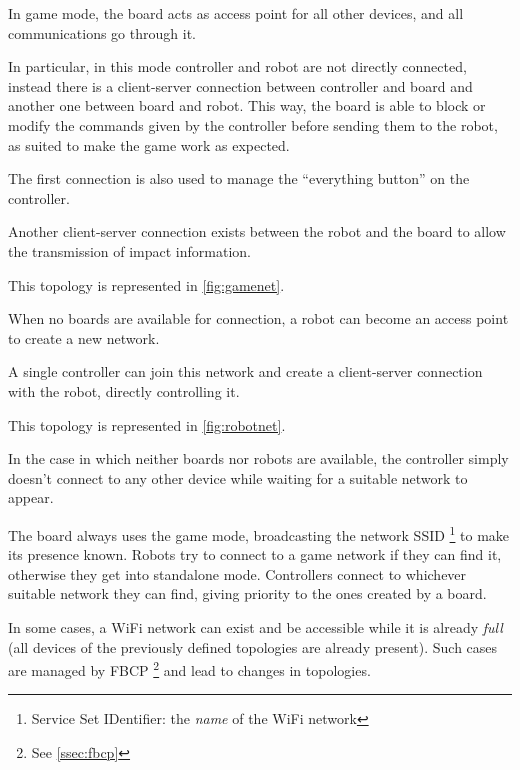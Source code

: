 \begin{description}[style=nextline]
\item[Standard Game Network (SSID starting with
  \code{FlipperBot-Board-})]
  In game mode, the board acts as access point for all other devices,
  and all communications go through it.

  In particular, in this mode controller and robot are not directly
  connected, instead there is a client-server connection between
  controller and board and another one between board and robot. This
  way, the board is able to block or modify the commands given by
  the controller before sending them to the robot, as suited to make
  the game work as expected.

  The first connection is also used to manage the \textquotedblleft{}everything button\textquotedblright{}
  on the controller.

  Another client-server connection exists between the robot and the
  board to allow the transmission of impact information.

  This topology is represented in \autoref{fig:gamenet}.

\item[Standalone Network (SSID starting with
  \code{FlipperBot-Robot-})]
  When no boards are available for connection, a robot can become an
  access point to create a new network.

  A single controller can join this network and create a
  client-server connection with the robot, directly controlling it.
  
  This topology is represented in \autoref{fig:robotnet}.

\item[Isolated Network]
  In the case in which neither boards nor robots are available, the
  controller simply doesn't connect to any other device while
  waiting for a suitable network to appear.

\end{description}
The board always uses the game mode, broadcasting the network SSID%
\footnote{Service Set IDentifier: the \textit{name} of the WiFi
network} to make its presence known. Robots try to connect to a game
network if they can find it, otherwise they get into standalone
mode. Controllers connect to whichever suitable network they can
find, giving priority to the ones created by a board.

In some cases, a WiFi network can exist and be accessible while it
is already \textit{full} (all devices of the previously defined
topologies are already present). Such cases are managed by FBCP%
\footnote{See \autoref{ssec:fbcp}} and lead to changes in topologies.

